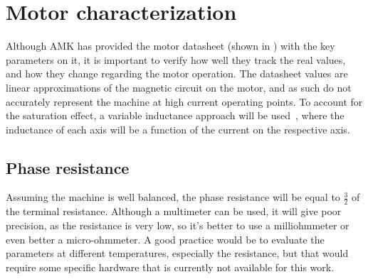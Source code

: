 \section{Motor characterization}
\label{section:motor_characterization}
\vfill

Although AMK has provided the motor datasheet (shown in ) with the key parameters on it, it is important to verify how well they track the real values, and how they change regarding the motor operation. The datasheet values are linear approximations of the magnetic circuit on the motor, and as such do not accurately represent the machine at high current operating points. To account for the saturation effect, a variable inductance approach will be used~\cite{Wijenayake:saturation_model:1997,Stumberger:saturation_model:2003}, where the inductance of each axis will be a function of the current on the respective axis. 

\subsection{Phase resistance}
Assuming the machine is well balanced, the phase resistance will be equal to $\frac{3}{2}$ of the terminal resistance. Although a multimeter can be used, it will give poor precision, as the resistance is very low, so it's better to use a milliohmmeter or even better a micro-ohmmeter. A good practice would be to evaluate the parameters at different temperatures, especially the resistance, but that would require some specific hardware that is currently not available for this work.

